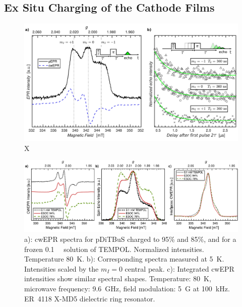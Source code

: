 \subsection{Ex Situ Charging of the Cathode Films}



\begin{figure}[h]
\center
	\includegraphics[width=1\textwidth]{./pulse/figures/SAW_Figure_8.pdf}
	\caption{X}
	\label{fig:FSE_vs_CW_DiTS_rel_times}
\end{figure}

\begin{figure}[h]
\center
	\includegraphics[width=1\textwidth]{./pulse/figures/Figure_3_INTS.pdf}
	\caption{a): cwEPR spectra for pDiTBuS charged to 95\% and 85\%, and for a frozen 0.1~\si{\milli\Molar}  solution of TEMPOL. Normalized intensities. Temperature 80~K. b): Corresponding  spectra measured at 5~K. Intensities scaled by the $m_I=0$ central peak. c): Integrated cwEPR intensities show similar spectral shapes. Temperature: 80~K, microwave frequency: 9.6~GHz, field modulation: 5~G at 100~kHz. ER~4118 X-MD5 dielectric ring resonator.}
	\label{fig:FSE_vs_CW_vs_INTS_DiTBuS}
\end{figure}



